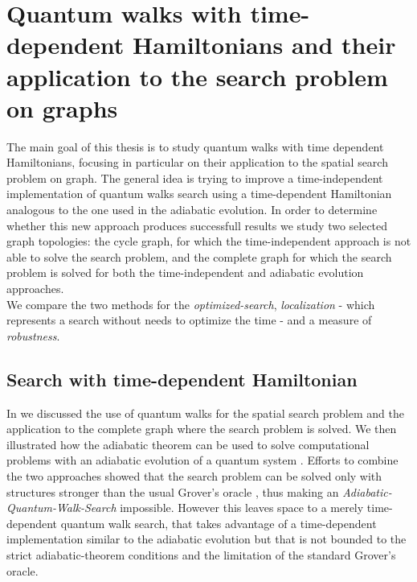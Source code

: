 \newpage
\thispagestyle{empty}
\singlespacing
\chapter{Quantum walks with time-dependent Hamiltonians and their application to the search problem on graphs}
\onehalfspacing
The main goal of this thesis is to study quantum walks with time dependent Hamiltonians, focusing in particular on their application to the spatial search problem on graph. The general idea is trying to improve a time-independent implementation of quantum walks search using a time-dependent Hamiltonian analogous to the one used in the adiabatic evolution. In order to determine whether this new approach produces successfull results we study two selected graph topologies: the cycle graph, for which the time-independent approach is not able to solve the search problem, and the complete graph for which the search problem is solved for both the time-independent and adiabatic evolution approaches. \\ We compare the two methods for the \textit{optimized-search}, \textit{localization} - which represents a search without needs to optimize the time - and a measure of \textit{robustness}.

\section{Search with time-dependent Hamiltonian}
In  we discussed the use of quantum walks for the spatial search problem \cite{Childs2004} and the application to the complete graph where the search problem is solved. We then illustrated how the adiabatic theorem can be used to solve computational problems with an adiabatic evolution of a quantum system \cite{Farhi2000}. Efforts to combine the two approaches showed that the search problem can be solved only with structures stronger than the usual Grover's oracle \cite{Wong2016}, thus making an \textit{Adiabatic-Quantum-Walk-Search} impossible. However this leaves space to a merely time-dependent quantum walk search, that takes advantage of a time-dependent implementation similar to the adiabatic evolution but that is not bounded to the strict adiabatic-theorem conditions and the limitation of the standard Grover's oracle.


